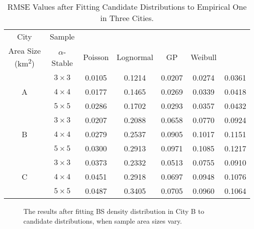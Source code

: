 \begin{table}
\centering
\caption{RMSE Values after Fitting Candidate Distributions to Empirical One in Three Cities.}
\setlength\abovecaptionskip{-5pt}
\setlength\belowcaptionskip{-5pt}
\begin{tabular}{ccccccc}
\toprule
City & Sample\\ Area Size (km\textsuperscript{2}) & $\alpha$-Stable & Poisson & Lognormal & GP & Weibull \\
\midrule
\multirow {3}{*}{A} & $3\times3$ & 0.0105 & 0.1214 & 0.0207 &  0.0274 & 0.0361\\
& $4\times4$ & 0.0177 & 0.1465 & 0.0269 & 0.0339 & 0.0418\\
& $5\times5$ & 0.0286 & 0.1702 & 0.0293 & 0.0357 & 0.0432 \\
\midrule
\multirow {3}{*}{B} & $3\times3$ & 0.0207 & 0.2088 & 0.0658 & 0.0770 & 0.0924 \\
& $4\times4$ & 0.0279 & 0.2537 & 0.0905 & 0.1017 & 0.1151 \\
& $5\times5$ & 0.0300 & 0.2913 & 0.0971 & 0.1085 & 0.1217 \\
\midrule
\multirow {3}{*}{C} & $3\times3$ & 0.0373 & 0.2332 & 0.0513 & 0.0755 & 0.0910\\
& $4\times4$ & 0.0451 & 0.2918 & 0.0697 & 0.0948 & 0.1076 \\
& $5\times5$ & 0.0487 & 0.3405 & 0.0705 & 0.0960 & 0.1064 \\
\bottomrule
\end{tabular}%
\label{tb:rmse}%
\end{table}%

\begin{figure*}
	\centering
    \setlength\abovecaptionskip{0pt}
    \setlength\belowcaptionskip{-5pt}
	\hspace{1em}
	\hspace{1em}
	\caption{The results after fitting BS density distribution in City B to candidate distributions, when sample area sizes vary.}
\end{figure*}

